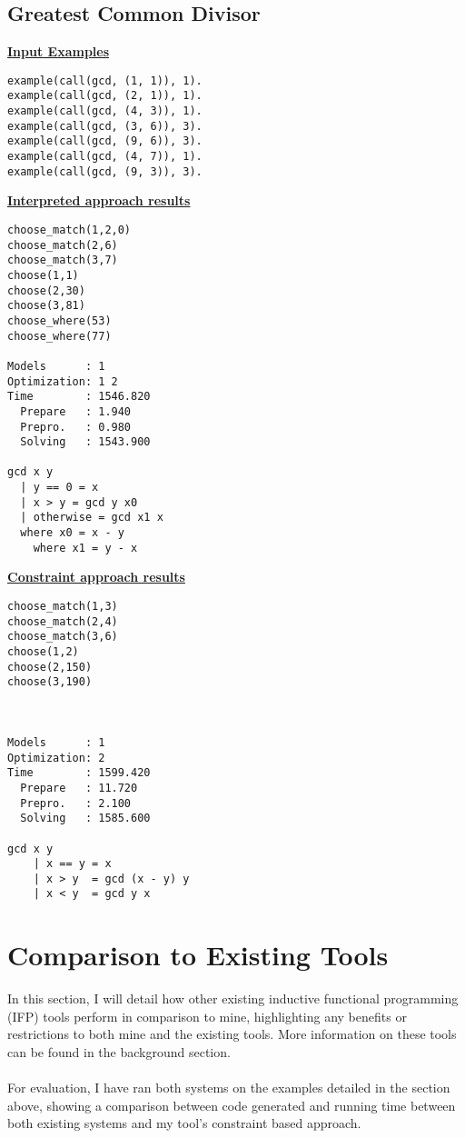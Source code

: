 \subsection{Greatest Common Divisor}
\underline{\textbf{Input Examples}}
\begin{lstlisting}
example(call(gcd, (1, 1)), 1).
example(call(gcd, (2, 1)), 1).
example(call(gcd, (4, 3)), 1).
example(call(gcd, (3, 6)), 3).
example(call(gcd, (9, 6)), 3).
example(call(gcd, (4, 7)), 1).
example(call(gcd, (9, 3)), 3).
\end{lstlisting}
\begin{multicols*}{2}
\underline{\textbf{Interpreted approach results}}
\begin{lstlisting}
choose_match(1,2,0) 
choose_match(2,6) 
choose_match(3,7)   
choose(1,1) 
choose(2,30) 
choose(3,81) 
choose_where(53) 
choose_where(77) 

Models      : 1     
Optimization: 1 2 
Time        : 1546.820
  Prepare   : 1.940
  Prepro.   : 0.980
  Solving   : 1543.900
  
gcd x y
  | y == 0 = x
  | x > y = gcd y x0
  | otherwise = gcd x1 x
  where x0 = x - y
  	where x1 = y - x
\end{lstlisting}
\vfill
\columnbreak
\underline{\textbf{Constraint approach results}}
\begin{lstlisting}
choose_match(1,3)
choose_match(2,4)
choose_match(3,6)  
choose(1,2) 
choose(2,150) 
choose(3,190) 



Models      : 1     
Optimization: 2 
Time        : 1599.420
  Prepare   : 11.720
  Prepro.   : 2.100
  Solving   : 1585.600

gcd x y
	| x == y = x
	| x > y	 = gcd (x - y) y
	| x < y	 = gcd y x
\end{lstlisting}
\end{multicols*}
\pagebreak
\section{Comparison to Existing Tools}

In this section, I will detail how other existing inductive functional programming (IFP) tools perform in comparison to mine, highlighting any benefits or restrictions to both mine and the existing tools. More information on these tools can be found in the background section. \\ \\
For evaluation, I have ran both systems on the examples detailed in the section above, showing a comparison between code generated and running time between both existing systems and my tool's constraint based approach.

